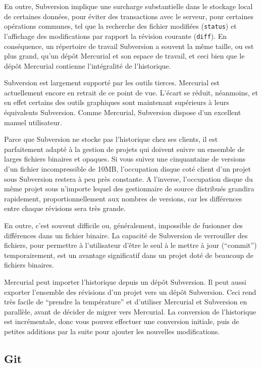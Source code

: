 En outre, Subversion implique une surcharge substantielle dans le stockage local
de certaines données, pour éviter des transactions avec le serveur, pour 
certaines opérations communes, tel que la recherche des fichier modifiées
(\texttt{status}) et l'affichage des modifications par rapport la révision 
courante (\texttt{diff}). En conséquence, un répertoire de travail Subversion
a souvent la même taille, ou est plus grand, qu'un dépôt Mercurial et son
espace de travail, et ceci bien que le dépôt Mercurial contienne l'intégralité 
de l'historique.

Subversion est largement supporté par les outils tierces. Mercurial est
actuellement encore en retrait de ce point de vue. L'écart se réduit, néanmoins,
et en effet certains des outils graphiques sont maintenant supérieurs à leurs
équivalents Subversion. Comme Mercurial, Subversion dispose d'un excellent
manuel utilisateur.

Parce que Subversion ne stocke pas l'historique chez ses clients, il est 
parfaitement adapté à la gestion de projets qui doivent suivre un ensemble
de larges fichiers binaires et opaques. Si vous suivez une cinquantaine de
versions d'un fichier incompressible de 10MB, l'occupation disque coté client
d'un projet sous Subversion restera à peu près constante. A l'inverse, 
l'occupation disque du même projet sous n'importe lequel des gestionnaire
de source distribués grandira rapidement, proportionnellement aux nombres
de versions, car les différences entre chaque révisions sera très grande.

En outre, c'est souvent difficile ou, généralement, impossible de fusionner
des différences dans un fichier binaire. La capacité de Subversion de 
verrouiller des fichiers, pour permettre à l'utilisateur d'être le seul
à le mettre à jour (``commit'') temporairement, est un avantage significatif
dans un projet doté de beaucoup de fichiers binaires.

Mercurial peut importer l'historique depuis un dépôt Subversion. Il peut
aussi exporter l'ensemble des révisions d'un projet vers un dépôt Subversion.
Ceci rend très facile de ``prendre la température'' et d'utiliser Mercurial et Subversion
en parallèle, avant de décider de migrer vers Mercurial. La conversion de 
l'historique est incrémentale, donc vous pouvez effectuer une conversion 
initiale, puis de petites additions par la suite pour ajouter les nouvelles
modifications.

\subsection{Git}

